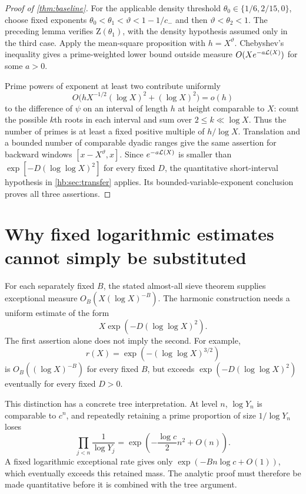 \begin{proof}[Proof of \cref{thm:baseline}]
For the applicable density threshold $\theta_0\in\{1/6,2/15,0\}$,
choose fixed exponents
$\theta_0<\theta_1<\vartheta<1-1/c_-$ and then
$\vartheta<\theta_2<1$. The preceding lemma verifies
$\mathrm Z(\theta_1)$, with the density hypothesis assumed only in
the third case. Apply the mean-square proposition with
$h=X^\vartheta$. Chebyshev's inequality gives a prime-weighted lower
bound outside measure $O(Xe^{-a\mathcal L(X)})$ for some $a>0$.

Prime powers of exponent at least two contribute uniformly
\[
 O\bigl(hX^{-1/2}(\log X)^2+(\log X)^2\bigr)=o(h)
\]
to the difference of $\psi$ on an interval of length $h$ at height
comparable to $X$: count the possible $k$th roots in each interval
and sum over $2\le k\ll\log X$.
Thus the number of primes is at least a fixed positive multiple of
$h/\log X$. Translation and a bounded number of comparable dyadic
ranges give the same assertion for backward windows
$[x-X^\vartheta,x]$.
Since $e^{-a\mathcal L(X)}$ is smaller than
$\exp[-D(\log\log X)^2]$ for every fixed $D$, the quantitative
short-interval hypothesis in \cref{hb:sec:transfer} applies.
Its bounded-variable-exponent conclusion proves all three assertions.
\end{proof}

\section{Why fixed logarithmic estimates cannot simply be substituted}

For each separately fixed $B$, the stated almost-all sieve theorem supplies exceptional
measure $O_B(X(\log X)^{-B})$.
The harmonic construction needs a uniform estimate of the form
\[
             X\exp(-D(\log\log X)^2).
\]
The first assertion alone does not imply the second.
For example,
\[
             r(X)=\exp(-(\log\log X)^{3/2})
\]
is $O_B((\log X)^{-B})$ for every fixed $B$, but exceeds
$\exp(-D(\log\log X)^2)$ eventually for every fixed $D>0$.

This distinction has a concrete tree interpretation.
At level $n$, $\log Y_n$ is comparable to $c^n$, and repeatedly retaining
a prime proportion of size $1/\log Y_n$ loses
\[
 \prod_{j<n}\frac1{\log Y_j}
       =\exp\left(-\frac{\log c}{2}n^2+O(n)\right).
\]
A fixed logarithmic exceptional rate gives only
$\exp(-Bn\log c+O(1))$, which eventually exceeds this retained mass.
The analytic proof must therefore be made quantitative before it is
combined with the tree argument.

